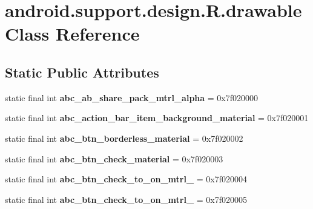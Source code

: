 \hypertarget{classandroid_1_1support_1_1design_1_1_r_1_1drawable}{}\section{android.\+support.\+design.\+R.\+drawable Class Reference}
\label{classandroid_1_1support_1_1design_1_1_r_1_1drawable}
\subsection*{Static Public Attributes}
\begin{DoxyCompactItemize}
\item 
\hypertarget{classandroid_1_1support_1_1design_1_1_r_1_1drawable_a625cabc6eb240aa7880b51672cf7a8fe}{}static final int {\bfseries abc\+\_\+ab\+\_\+share\+\_\+pack\+\_\+mtrl\+\_\+alpha} = 0x7f020000\label{classandroid_1_1support_1_1design_1_1_r_1_1drawable_a625cabc6eb240aa7880b51672cf7a8fe}

\item 
\hypertarget{classandroid_1_1support_1_1design_1_1_r_1_1drawable_a68a1b154dd7f464140cfa7da69c3f930}{}static final int {\bfseries abc\+\_\+action\+\_\+bar\+\_\+item\+\_\+background\+\_\+material} = 0x7f020001\label{classandroid_1_1support_1_1design_1_1_r_1_1drawable_a68a1b154dd7f464140cfa7da69c3f930}

\item 
\hypertarget{classandroid_1_1support_1_1design_1_1_r_1_1drawable_a9aec4c6386a209299b4feedfeb3cfc32}{}static final int {\bfseries abc\+\_\+btn\+\_\+borderless\+\_\+material} = 0x7f020002\label{classandroid_1_1support_1_1design_1_1_r_1_1drawable_a9aec4c6386a209299b4feedfeb3cfc32}

\item 
\hypertarget{classandroid_1_1support_1_1design_1_1_r_1_1drawable_a765ed07aab918db5eb82ac420614fb81}{}static final int {\bfseries abc\+\_\+btn\+\_\+check\+\_\+material} = 0x7f020003\label{classandroid_1_1support_1_1design_1_1_r_1_1drawable_a765ed07aab918db5eb82ac420614fb81}

\item 
\hypertarget{classandroid_1_1support_1_1design_1_1_r_1_1drawable_a14f5a95b1142d505e2ab42008b9be478}{}static final int {\bfseries abc\+\_\+btn\+\_\+check\+\_\+to\+\_\+on\+\_\+mtrl\+\_} = 0x7f020004\label{classandroid_1_1support_1_1design_1_1_r_1_1drawable_a14f5a95b1142d505e2ab42008b9be478}

\item 
\hypertarget{classandroid_1_1support_1_1design_1_1_r_1_1drawable_a875816c18771a913557708c7f31df30d}{}static final int {\bfseries abc\+\_\+btn\+\_\+check\+\_\+to\+\_\+on\+\_\+mtrl\+\_} = 0x7f020005\label{classandroid_1_1support_1_1design_1_1_r_1_1drawable_a875816c18771a913557708c7f31df30d}


\end{DoxyCompactItemize}
